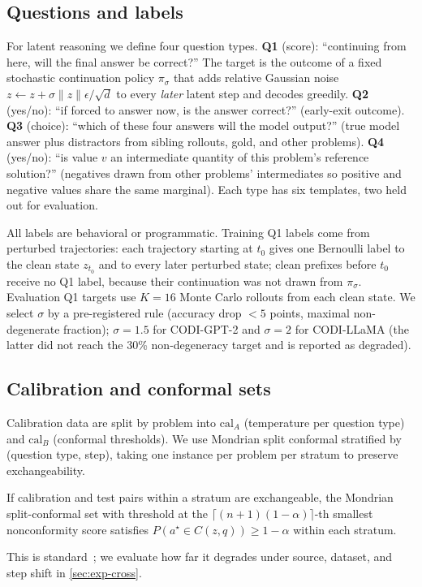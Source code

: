\subsection{Questions and labels}
\label{sec:labels}
For latent reasoning we define four question types. \textbf{Q1} (score): ``continuing from here, will the final answer be correct?'' The target is the outcome of a fixed stochastic continuation policy $\pi_\sigma$ that adds relative Gaussian noise $z\leftarrow z+\sigma\|z\|\epsilon/\sqrt{d}$ to every \emph{later} latent step and decodes greedily. \textbf{Q2} (yes/no): ``if forced to answer now, is the answer correct?'' (early-exit outcome). \textbf{Q3} (choice): ``which of these four answers will the model output?'' (true model answer plus distractors from sibling rollouts, gold, and other problems). \textbf{Q4} (yes/no): ``is value $v$ an intermediate quantity of this problem's reference solution?'' (negatives drawn from other problems' intermediates so positive and negative values share the same marginal). Each type has six templates, two held out for evaluation.

All labels are behavioral or programmatic. Training Q1 labels come from perturbed trajectories: each trajectory starting at $t_0$ gives one Bernoulli label to the clean state $z_{t_0}$ and to every later perturbed state; clean prefixes before $t_0$ receive no Q1 label, because their continuation was not drawn from $\pi_\sigma$. Evaluation Q1 targets use $K{=}16$ Monte Carlo rollouts from each clean state. We select $\sigma$ by a pre-registered rule (accuracy drop $<5$ points, maximal non-degenerate fraction); $\sigma=1.5$ for CODI-GPT-2 and $\sigma=2$ for CODI-LLaMA (the latter did not reach the 30\% non-degeneracy target and is reported as degraded).

\subsection{Calibration and conformal sets}
Calibration data are split by problem into $\mathrm{cal}_A$ (temperature per question type) and $\mathrm{cal}_B$ (conformal thresholds). We use Mondrian split conformal stratified by (question type, step), taking one instance per problem per stratum to preserve exchangeability.

\begin{proposition}[Coverage]
If calibration and test pairs within a stratum are exchangeable, the Mondrian split-conformal set with threshold at the $\lceil (n+1)(1-\alpha)\rceil$-th smallest nonconformity score satisfies $P(a^\star \in C(z,q)) \ge 1-\alpha$ within each stratum.
\end{proposition}
This is standard~\cite{vovk2005alrw}; we evaluate how far it degrades under source, dataset, and step shift in \cref{sec:exp-cross}.

